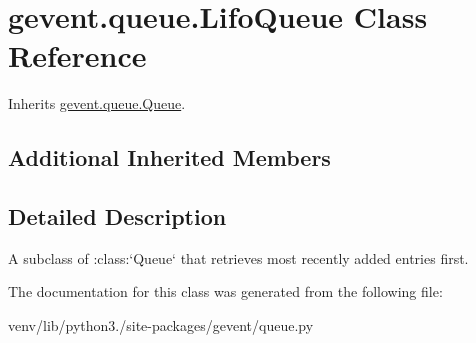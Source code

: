\hypertarget{classgevent_1_1queue_1_1_lifo_queue}{}\section{gevent.\+queue.\+Lifo\+Queue Class Reference}
\label{classgevent_1_1queue_1_1_lifo_queue}


Inherits \hyperlink{classgevent_1_1queue_1_1_queue}{gevent.\+queue.\+Queue}.

\subsection*{Additional Inherited Members}


\subsection{Detailed Description}
\begin{DoxyVerb}A subclass of :class:`Queue` that retrieves most recently added entries first.\end{DoxyVerb}
 

The documentation for this class was generated from the following file\+:\begin{DoxyCompactItemize}
\item 
venv/lib/python3./site-\/packages/gevent/queue.\+py\end{DoxyCompactItemize}
